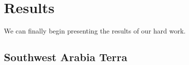 \documentclass[12pt]{article}
\begin{document}
\section{Results}
\label{sec:results}
\par We can finally begin presenting the results of our hard work.
\subsection{Southwest Arabia Terra}
\label{sub:southwest_arabia_terra}
\begin{figure}[h!]
  \centering
  \begin{subfigure}[t]{0.33\textwidth}
    \centering

\end{subfigure}
\end{figure}
\end{document}
